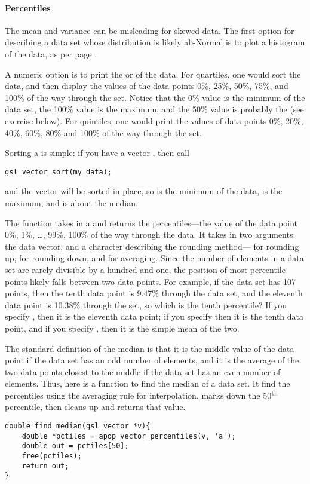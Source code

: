 \paragraph{Percentiles}  The mean and variance can be misleading for
skewed data. The first option for describing a data set whose
distribution is likely ab-Normal is to plot a histogram of the data, as
per page \pageref{histosec}.

A numeric option is to print the  or  of the
data. For quartiles, one would sort the data, and then display the 
values of the data points 0\%, 25\%, 50\%, 75\%, and 100\% of the
way through the set. Notice that the 0\% value is the minimum of the data
set, the 100\% value is the maximum, and the 50\% value is probably the
 (see exercise below). For quintiles, one would print the
values of data points  0\%, 20\%, 40\%, 60\%, 80\% and 100\% of the way
through the set.

Sorting  a  is 
simple: if you have a vector , then call
\begin{lstlisting}
gsl_vector_sort(my_data);
\end{lstlisting}
and the vector will be sorted in place, so
 is the minimum of the data,
 is the maximum, and 
 is about the median.

The function  takes in a
 and returns the percentiles---the value of the
data point 0\%, 1\%, \dots, 99\%, 100\% of the way through the data.
It takes in two arguments: the data vector, and a character describing
the rounding method--- for rounding up,  for rounding
down, and  for averaging. Since the number of elements in a
data set are rarely divisible by a hundred and one, the position of most
percentile points likely falls between two data points. For example, if
the data set has 107 points, then the tenth data point is 9.47\% through
the data set, and the eleventh data point is 10.38\% through the set, so
which is the tenth percentile? If you specify , then it is the
eleventh data point; if you specify  then it is the tenth data
point, and if you specify , then it is the simple mean of the two.

The standard definition of the median is that it is the middle
value of the data point if the data set has an odd number of elements,
and it is the average of the two data points closest to the middle if
the data set has an even number of elements. 
Thus, here is a function to find the median of a data set. It find the
percentiles using the averaging rule for interpolation, marks down the
$50^{\rm th}$ percentile, then cleans up and returns that value.
\begin{lstlisting}
double find_median(gsl_vector *v){
    double *pctiles = apop_vector_percentiles(v, 'a');
    double out = pctiles[50];
    free(pctiles);
    return out;
}
\end{lstlisting}

